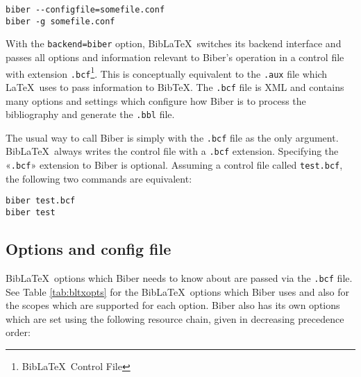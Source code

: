 \documentclass{ltxdockit}
\begin{document}
\begin{verbatim}
biber --configfile=somefile.conf
biber -g somefile.conf
\end{verbatim}

With the \verb+backend=biber+ option, Bib\LaTeX\ switches its backend
interface and passes all options and information relevant to Biber's
operation in a control file with extension \verb+.bcf+\footnote{Bib\LaTeX\ Control
  File}. This is conceptually equivalent to the \verb+.aux+ file which
\LaTeX\ uses to pass information to Bib\TeX. The \verb+.bcf+ file is
XML and contains many options and settings which configure how Biber
is to process the bibliography and generate the \verb+.bbl+ file.

The usual way to call Biber is simply with the \verb+.bcf+ file
as the only argument. Bib\LaTeX\ always writes the control file with
a \verb+.bcf+ extension. Specifying the «\verb+.bcf+» extension to
Biber is optional. Assuming a control file called
\verb+test.bcf+, the following two commands are equivalent:

\begin{verbatim}
biber test.bcf
biber test
\end{verbatim}

\subsection{Options and config file}
Bib\LaTeX\ options which Biber needs to know about are passed
via the \verb+.bcf+ file. See Table \ref{tab:bltxopts} for the Bib\LaTeX\
options which Biber uses and also for the scopes which are supported
for each option. Biber also has its own options which are set using
the following resource chain, given in decreasing precedence order:\\[2ex]
\end{document}
